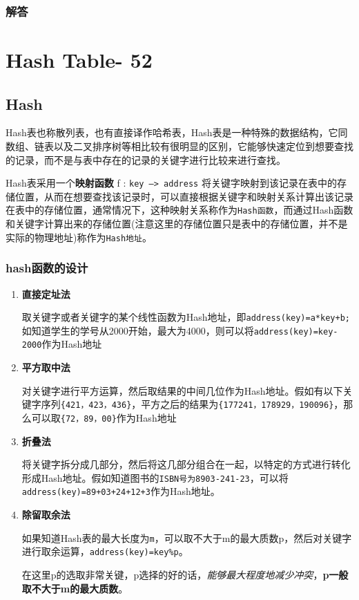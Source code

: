 \documentclass[UTF8,a4paper,12pt]{ctexbook}
\begin{document}
	\subsection{解答}
	
\chapter{Hash Table- 52}
\section{Hash}
	Hash表也称散列表，也有直接译作哈希表，Hash表是一种特殊的数据结构，它同数组、链表以及二叉排序树等相比较有很明显的区别，它能够快速定位到想要查找的记录，而不是与表中存在的记录的关键字进行比较来进行查找。
	
	Hash表采用一个\textbf{映射函数} f : \verb|key —> address| 将关键字映射到该记录在表中的存储位置，从而在想要查找该记录时，可以直接根据关键字和映射关系计算出该记录在表中的存储位置，通常情况下，这种映射关系称作为\verb|Hash函数|，而通过Hash函数和关键字计算出来的存储位置(注意这里的存储位置只是表中的存储位置，并不是实际的物理地址)称作为\verb|Hash地址|。
	

	\subsection{hash函数的设计}
		\begin{enumerate}
			\item \textbf{直接定址法}
			
				取关键字或者关键字的某个线性函数为Hash地址，即\verb|address(key)=a*key+b;|如知道学生的学号从2000开始，最大为4000，则可以将\verb|address(key)=key-2000|作为Hash地址
			\item \textbf{平方取中法}
			
				对关键字进行平方运算，然后取结果的中间几位作为Hash地址。假如有以下关键字序列\verb|{421，423，436}|，平方之后的结果为\verb|{177241，178929，190096}|，那么可以取\verb|{72，89，00}|作为Hash地址
			\item \textbf{折叠法}
			
				将关键字拆分成几部分，然后将这几部分组合在一起，以特定的方式进行转化形成Hash地址。假如知道图书的\verb|ISBN号为8903-241-23|，可以将\verb|address(key)=89+03+24+12+3|作为Hash地址。
			\item \textbf{除留取余法}
				
				如果知道Hash表的最大长度为\verb|m|，可以取不大于m的最大质数p，然后对关键字进行取余运算，\verb|address(key)=key%p|。
				
				在这里p的选取非常关键，p选择的好的话，\textit{能够最大程度地减少冲突}，\textbf{p一般取不大于m的最大质数}。
		\end{enumerate}
\end{document}
